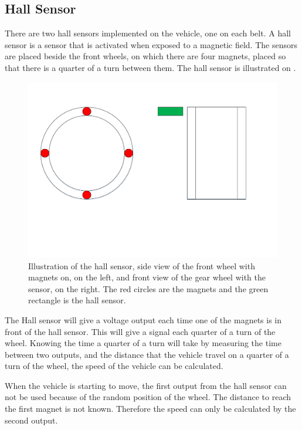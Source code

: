 \subsection{Hall Sensor}

There are two hall sensors implemented on the vehicle, one on each belt. A hall sensor is a sensor that is activated when exposed to a magnetic field. The sensors are placed beside the front wheels, on which there are four magnets, placed so that there is a quarter of a turn between them. The hall sensor is illustrated on .

 \begin{figure}[H]
	\centering
	\includegraphics[scale=0.5]{figures/HallSensorSide_Forward_view.pdf}
	\caption{Illustration of the hall sensor, side view of the front wheel with magnets on, on the left, and front view of the gear wheel with the sensor, on the right. The red circles are the magnets and the green rectangle is the hall sensor.}
	\label{HallSensor}
\end{figure}

The Hall sensor will give a voltage output each time one of the magnets is in front of the hall sensor. This will give a signal each quarter of a turn of the wheel. Knowing the time a quarter of a turn will take by measuring the time between two outputs, and the distance that the vehicle travel on a quarter of a turn of the wheel, the speed of the vehicle can be calculated.

When the vehicle is starting to move, the first output from the hall sensor can not be used because of the random position of the wheel. The distance to reach the first magnet is not known. Therefore the speed can only be calculated by the second output.